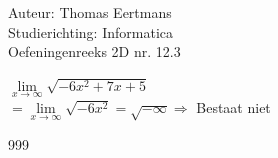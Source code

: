 \documentclass[a4paper]{article}
\begin{document}
  
\noindent \large Auteur: Thomas Eertmans \\
\noindent \large Studierichting: Informatica\\
\noindent \large Oefeningenreeks 2D nr. 12.3\\

\medskip

\normalsize

$\lim\limits_{x\rightarrow\infty} \sqrt{-6x^2+7x+5}$ \\

$= \lim\limits_{x\rightarrow\infty} \sqrt{-6x^2} = \sqrt{-\infty} \Rightarrow$ Bestaat niet \\

\begin{thebibliography}{999}
\end{thebibliography}
\end{document}
